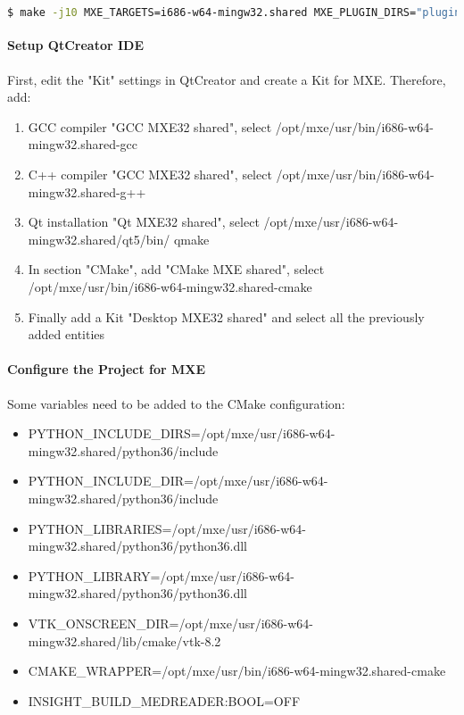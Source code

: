 \begin{lstlisting}[language=bash]
$ make -j10 MXE_TARGETS=i686-w64-mingw32.shared MXE_PLUGIN_DIRS="plugins/gcc10 plugins/boost_1_66_0" pe-util cgal gettext gcc glew glfw3 mesa harfbuzz armadillo boost dxflib freetype libgcrypt glib gsl hdf5 libiconv libidn libidn2 vtk oce openssl jpeg qt5 cryptopp poppler libntlm openssl wt tiff libgsasl
\end{lstlisting}


\paragraph{Setup QtCreator IDE}

First, edit the "Kit" settings in QtCreator and create a Kit for MXE.
Therefore, add:
\begin{enumerate}
\item GCC compiler "GCC MXE32 shared", select /opt/mxe/usr/bin/i686-w64-mingw32.shared-gcc
\item C++ compiler "GCC MXE32 shared", select /opt/mxe/usr/bin/i686-w64-mingw32.shared-g++
\item Qt installation "Qt MXE32 shared", select /opt/mxe/usr/i686-w64-mingw32.shared/qt5/bin/
qmake
\item In section "CMake", add "CMake MXE shared", select /opt/mxe/usr/bin/i686-w64-mingw32.shared-cmake
\item Finally add a Kit "Desktop MXE32 shared" and select all the previously added entities
\end{enumerate}

\paragraph{Configure the Project for MXE}

Some variables need to be added to the CMake configuration:
\begin{itemize}
\item PYTHON\_INCLUDE\_DIRS=/opt/mxe/usr/i686-w64-mingw32.shared/python36/include
\item PYTHON\_INCLUDE\_DIR=/opt/mxe/usr/i686-w64-mingw32.shared/python36/include
\item PYTHON\_LIBRARIES=/opt/mxe/usr/i686-w64-mingw32.shared/python36/python36.dll
\item PYTHON\_LIBRARY=/opt/mxe/usr/i686-w64-mingw32.shared/python36/python36.dll
\item VTK\_ONSCREEN\_DIR=/opt/mxe/usr/i686-w64-mingw32.shared/lib/cmake/vtk-8.2
\item CMAKE\_WRAPPER=/opt/mxe/usr/bin/i686-w64-mingw32.shared-cmake
\item INSIGHT\_BUILD\_MEDREADER:BOOL=OFF
\end{itemize}

